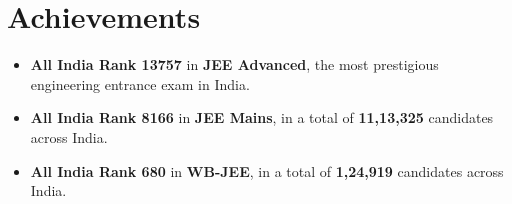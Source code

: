 \section{Achievements}
\begin{itemize} %
    \item \textbf{All India Rank 13757} in \textbf{JEE Advanced}, the most prestigious engineering entrance exam in India.
    \item \textbf{All India Rank 8166} in \textbf{JEE Mains}, in a total of \textbf{11,13,325} candidates across India.
    \item \textbf{All India Rank 680} in \textbf{WB-JEE}, in a total of \textbf{1,24,919} candidates across India.
\end{itemize} %
